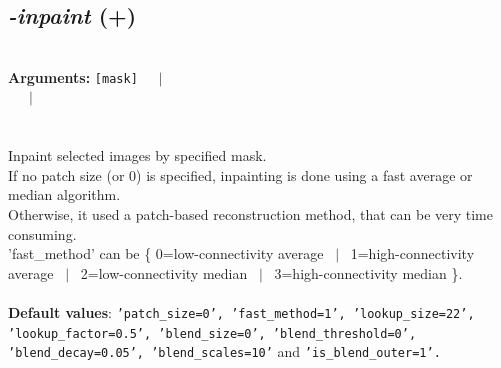 \documentclass[a4paper,11pt,twoside]{book}
\begin{document}
\subsection{\emph{-inpaint} (+)}\vspace*{-0.5em}
~\\\textbf{Arguments: } 
{\small \texttt{[mask]}}~~~$|$\\
~~~$|$\\
\\~\\
Inpaint selected images by specified mask.
~\\If no patch size (or 0) is specified, inpainting is done using a fast average or median algorithm.
~\\Otherwise, it used a patch-based reconstruction method, that can be very time consuming.
~\\'fast\_method' can be \{ 0=low-connectivity average ~$|$~ 1=high-connectivity average ~$|$~ 2=low-connectivity median ~$|$~ 3=high-connectivity median \}.
~\\~\\\textbf{Default values}: {\small \texttt{'patch\_size=0', 'fast\_method=1', 'lookup\_size=22', 'lookup\_factor=0.5', 'blend\_size=0', 'blend\_threshold=0', 'blend\_decay=0.05', 'blend\_scales=10'} and \texttt{'is\_blend\_outer=1'.}}
\end{document}
